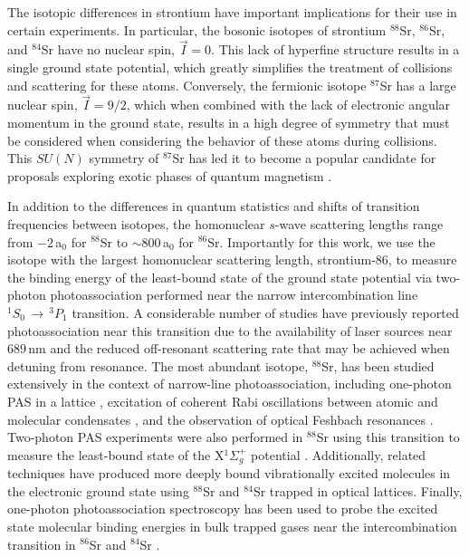 The isotopic differences in strontium have important implications for their use in certain experiments.
In particular, the bosonic isotopes of strontium $^{88}$Sr, $^{86}$Sr, and $^{84}$Sr have no nuclear spin, $\vec{I}=0$.
This lack of hyperfine structure results in a single ground state potential, which greatly simplifies the treatment of collisions and scattering for these atoms.
Conversely, the fermionic isotope $^{87}$Sr has a large nuclear spin, $\vec{I}=9/2$, which when combined with the lack of electronic angular momentum in the ground state, results in a high degree of symmetry that must be considered when considering the behavior of these atoms during collisions.
This $SU(N)$ symmetry of $^{87}$Sr has led it to become a popular candidate for proposals exploring exotic phases of quantum magnetism \cite{Beverland2016,cre14,Chen2015}.

In addition to the differences in quantum statistics and shifts of transition frequencies between isotopes, the homonuclear $s$-wave scattering lengths range from $-2\,$a$_0$ for $^{88}$Sr to $\sim\!800\,$a$_0$ for $^{86}$Sr.
Importantly for this work, we use the isotope with the largest homonuclear scattering length, strontium-86, to measure the binding energy of the least-bound state of the ground state potential via two-photon photoassociation performed near the narrow intercombination line $^1S_0\,\rightarrow\,^3P_1$ transition.
A considerable number of studies have previously reported photoassociation near this transition due to the availability of laser sources near $689\,$nm and the reduced off-resonant scattering rate that may be achieved when detuning from resonance.
The most abundant isotope, $^{88}$Sr, has been studied extensively in the context of narrow-line photoassociation, including one-photon PAS in a lattice \cite{Zelevinsky2006,McGuyer2013}, excitation of coherent Rabi oscillations between atomic and molecular condensates \cite{Yan2013b}, and the observation of optical Feshbach resonances \cite{Yan2013c, Blatt}.
Two-photon PAS experiments were also performed in $^{88}$Sr using this transition to measure the least-bound state of the X$^1\Sigma_g^+$ potential \cite{MartinezDeEscobar2008}.
Additionally, related techniques have produced more deeply bound vibrationally excited molecules in the electronic ground state using $^{88}$Sr \cite{Reinaudi2012, McGuyer2014, McGuyer2015a, rom12} and $^{84}$Sr \cite{Stellmer2012} trapped in optical lattices.
Finally, one-photon photoassociation spectroscopy has been used to probe the excited state molecular binding energies in bulk trapped gases near the intercombination transition in $^{86}$Sr \cite{Borkowski2014a, Reschovsky} and $^{84}$Sr \cite{Stellmer2012, Reschovsky}.

